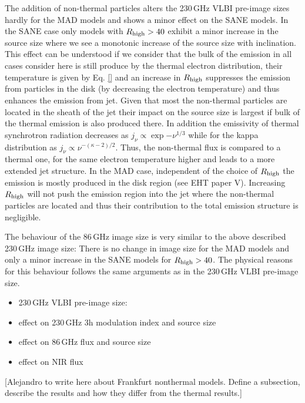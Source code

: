 The addition of non-thermal particles alters the 230\,GHz VLBI pre-image sizes hardly for the MAD models and shows a minor effect on the SANE models. In the SANE case only models with $R_{\rm high}>40$ exhibit a minor increase in the source size where we see a monotonic increase of the source size with inclination. This effect can be understood if we consider that the bulk of the emission in all cases consider here is still produce by the thermal electron distribution, their temperature is given by Eq. \ref{} and an increase in $R_{\rm high}$ suppresses the emission from particles in the disk (by decreasing the electron temperature) and thus enhances the emission from jet. 
Given that most the non-thermal particles are located in the sheath of the jet their impact on the source size is largest if bulk of the thermal emission is also produced there. In addition the emissivity of thermal synchrotron radiation decreases as $j_{\nu}\propto \exp{-\nu^{1/3}}$ while for the kappa distribution as $j_{\nu}\propto \nu^{-(\kappa -2)/2}$. Thus, the non-thermal flux is compared to a thermal one, for the same electron temperature higher and leads to a more extended jet structure.
In the MAD case, independent of the choice of $R_{\rm high}$ the emission is mostly produced in the disk region (see EHT paper V). Increasing $R_{\rm high}$ will not push the emission region into the jet where the non-thermal particles are located and thus their contribution to the total emission structure is negligible. 





The behaviour of the 86\,GHz image size is very similar to the above described 230\,GHz image size: There is no change in image size for the MAD models and only a minor increase in the SANE models for $R_{\rm high}>40$. The physical reasons for this behaviour follows the same arguments as in the 230\,GHz VLBI pre-image size.




\begin{itemize}
    \item 230\,GHz VLBI pre-image size: 
    \item effect on 230\,GHz 3h modulation index and source size
    \item effect on 86\,GHz flux and source size
    \item effect on NIR flux
\end{itemize}
[Alejandro to write here about Frankfurt nonthermal models.  Define a subsection, describe the results and how they differ from the thermal results.]

